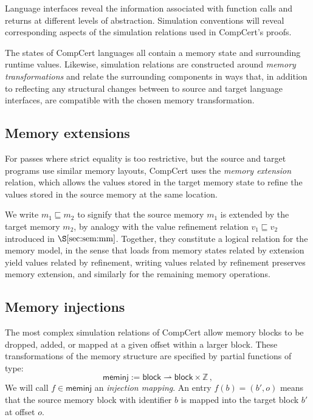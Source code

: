 \documentclass[sigplan,10pt,review,anonymous]{acmart}
\newcommand{\kw}[1]{\ensuremath{ \mathsf{#1} }}
\begin{document}
Language interfaces reveal the information
associated with function calls and returns
at different levels of abstraction.
Simulation conventions will
reveal corresponding aspects of the simulation relations
used in CompCert's proofs.

The states of CompCert languages all contain
a memory state and surrounding runtime values.
Likewise, simulation relations
are constructed around \emph{memory transformations}
and relate the surrounding components in ways that,
in addition to reflecting any structural changes
between to source and target language interfaces,
are compatible with the chosen memory transformation.

\subsection{Memory extensions} \label{sec:memext} %

For passes where strict equality is too restrictive,
but the source and target programs
use similar memory layouts,
CompCert uses the \emph{memory extension} relation,
which allows the values
stored in the target memory state to refine
the values stored in the source memory at the same location.

We write $m_1 \sqsubseteq m_2$ to signify that
the source memory $m_1$ is extended by
the target memory $m_2$,
by analogy with
the value refinement relation $v_1 \sqsubseteq v_2$
introduced in $\S\ref{sec:sem:mm}$.
Together,
they
constitute a logical relation for the memory model,
in the sense that
loads from memory states related by extension
yield values related by refinement,
writing values related by refinement
preserves memory extension,
and similarly for the remaining memory operations.


\subsection{Memory injections} \label{sec:meminj} %

The most complex simulation relations of CompCert
allow memory blocks to be dropped, added, or
mapped at a given offset within a larger block.
These transformations of the memory structure
are specified by partial functions of type:
\[
  \kw{meminj} := \kw{block} \rightharpoonup \kw{block} \times \mathbb{Z} \,,
\]
We will call $f \in \kw{meminj}$
an \emph{injection mapping}.
An entry $f(b) = (b', o)$
means that the source memory block with identifier $b$
is mapped into the target block $b'$
at offset $o$.
\end{document}
